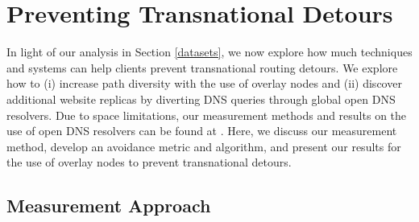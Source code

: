 \section{Preventing Transnational Detours}
\label{avoid_results}

In light of our analysis in Section \ref{datasets}, we now explore how
much techniques and systems can help clients prevent transnational
routing detours. We explore how to (i) increase path diversity with
the use of overlay nodes and (ii) discover additional website replicas
by diverting DNS queries through global open DNS resolvers.  Due to
space limitations, our measurement methods and results on the use of
open DNS resolvers can be found at \cite{characterizing_detours}.
Here, we discuss our measurement method, develop an avoidance metric
and algorithm, and present our results for the use of overlay nodes to
prevent transnational detours.

\subsection{Measurement Approach}
\label{avoid_pipelines}




